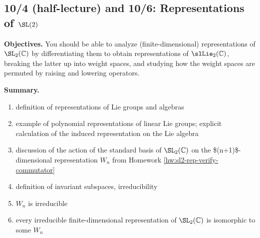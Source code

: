 \documentclass[reqno]{amsart} 
\begin{document}
\newpage
\subsection{10/4 (half-lecture) and 10/6: Representations of \texorpdfstring{$\SL(2)$}{SL2}}
\label{sec:org04627a1}
\textbf{Objectives.} You should be able to analyze (finite-dimensional) representations of \(\SL_2(\mathbb{C})\) by differentiating them to obtain representations of \(\slLie_2(\mathbb{C})\), breaking the latter up into weight spaces, and studying how the weight spaces are permuted by raising and lowering operators.

\textbf{Summary.}
\begin{enumerate}
\item definition of representations of Lie groups and algebras
\item example of polynomial representations of linear Lie groups; explicit calculation of the induced representation on the Lie algebra
\item discussion of the action of the standard basis of \(\SL_2(\mathbb{C})\) on the \$(n+1)\$-dimensional representation \(W_n\) from Homework \ref{hw:sl2-rep-verify-commutator}
\item definition of invariant subspaces, irreducibility
\item \(W_n\) is irreducible
\item every irreducible finite-dimensional representation of \(\SL_2(\mathbb{C})\) is isomorphic to some \(W_n\)
\end{enumerate}
\end{document}
